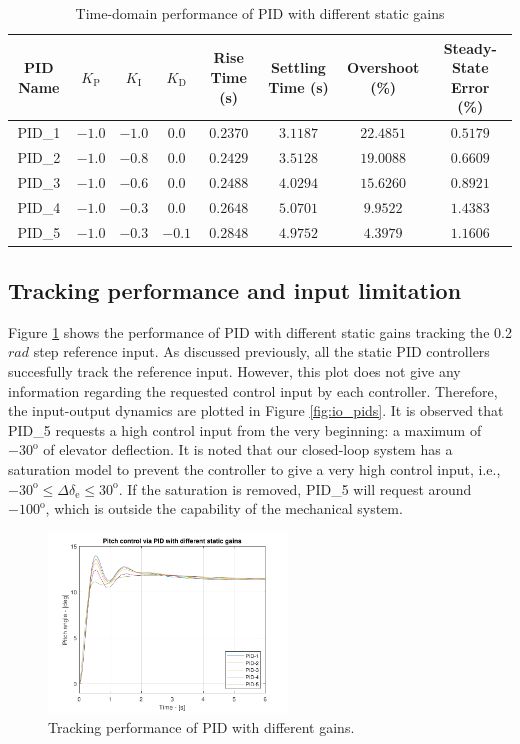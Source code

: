 \documentclass[lettersize,journal]{IEEEtran}
\begin{document}
\begin{table}[!t]
\caption{Time-domain performance of PID with different static gains}
\label{tab:different_pid_performance}
\centering
\begin{tabular}{|c||c||c||c||c||c||c|c|}
\hline
PID Name & $K_{\mathrm{P}}$  & $K_{\mathrm{I}}$ & $K_{\mathrm{D}}$ & Rise Time (s) & Settling Time (s) & Overshoot (\%) & Steady-State Error (\%) \\
\hline
PID\_1 & $-1.0$ & $-1.0$ & $0.0$ & $0.2370$ & $3.1187$ & $22.4851$ & $0.5179$ \\
\hline
PID\_2 & $-1.0$ & $-0.8$ & $0.0$ & $0.2429$ & $3.5128$ & $19.0088$ & $0.6609$ \\
\hline
PID\_3 & $-1.0$ & $-0.6$ & $0.0$ & $0.2488$ & $4.0294$ & $15.6260$ & $0.8921$ \\
\hline
PID\_4 & $-1.0$ & $-0.3$ & $0.0$ & $0.2648$ & $5.0701$ & $9.9522$ & $1.4383$ \\
\hline
PID\_5 & $-1.0$ & $-0.3$ & $-0.1$ & $0.2848$ & $4.9752$ & $4.3979$ & $1.1606$ \\
\hline
\end{tabular}
\end{table}

\subsection{Tracking performance and input limitation}

Figure \ref{fig:tracking_performance_pids} shows the performance of PID with different static gains tracking the 0.2 $rad$ step reference input. As discussed previously, all the static PID controllers succesfully track the reference input. However, this plot does not give any information regarding the requested control input by each controller. Therefore, the input-output dynamics are plotted in Figure \ref{fig:io_pids}. It is observed that PID\_5 requests a high control input from the very beginning: a maximum of $-30^\mathrm{o}$ of elevator deflection. It is noted that our closed-loop system has a saturation model to prevent the controller to give a very high control input, i.e., $-30^\mathrm{o} \leq \Delta \delta_{\mathrm{e}} \leq 30^\mathrm{o}$. If the saturation is removed, PID\_{5} will request around $-100^\mathrm{o}$, which is outside the capability of the mechanical system.

\begin{figure}[!t]
\centering
\includegraphics[width=2.5in]{figs/tracking_performance_pids.pdf}
\caption{Tracking performance of PID with different gains.}
\label{fig:tracking_performance_pids}
\end{figure}
\end{document}
